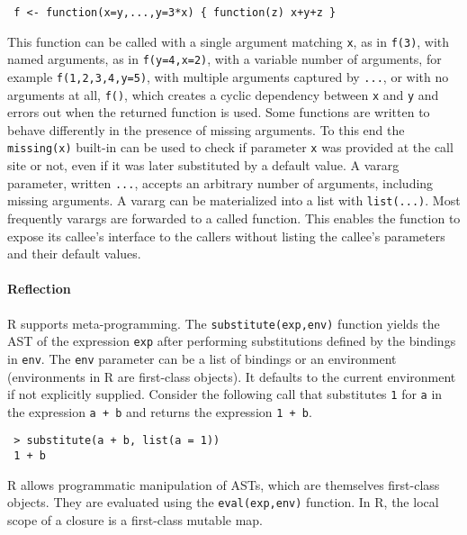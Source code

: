 \documentclass[review,screen,acmsmall]{acmart}
\renewcommand{\c}[1]{\lstinline |#1|\xspace}
\begin{document}
\begin{lstlisting}
 f <- function(x=y,...,y=3*x) { function(z) x+y+z }
\end{lstlisting}


This function can be called with a single argument matching \c x, as in
\c{f(3)}, with named arguments, as in \c{f(y=4,x=2)}, with a variable number of
arguments, for example \c{f(1,2,3,4,y=5)}, with multiple arguments captured by
\c{...}, or with no arguments at all, \c{f()}, which creates a cyclic dependency
between \c x and \c y and errors out when the returned function is used. Some
functions are written to behave differently in the presence of missing
arguments. To this end the \c{missing(x)} built-in can be used to check if
parameter \c{x} was provided at the call site or not, even if it was later
substituted by a default value. A vararg parameter, written \c{...}, accepts an
arbitrary number of arguments, including missing arguments. A vararg can be
materialized into a list with \c{list(...)}. Most frequently varargs are
forwarded to a called function. This enables the function to expose its callee's
interface to the callers without listing the callee's parameters and their
default values.

\paragraph{Reflection}
R supports meta-programming. The \c{substitute(exp,env)} function yields the AST
of the expression \c{exp} after performing substitutions defined by the bindings
in \c{env}. The \c{env} parameter can be a list of bindings or an environment
(environments in R are first-class objects). It defaults to the current
environment if not explicitly supplied. Consider the following call that
substitutes \c 1 for \c a in the expression \c{a + b} and returns the expression
\c{1 + b}.

\begin{lstlisting}
 > substitute(a + b, list(a = 1))
 1 + b
\end{lstlisting}

R allows programmatic manipulation of ASTs, which are themselves first-class
objects. They are evaluated using the \c{eval(exp,env)} function. In R, the
local scope of a closure is a first-class mutable map.
\end{document}
